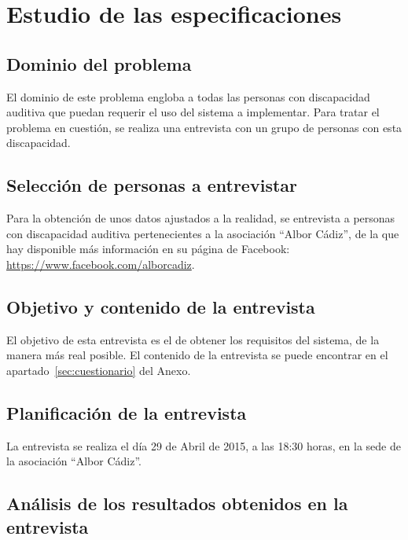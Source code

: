 \section{Estudio de las especificaciones}
    \subsection{Dominio del problema}

    El dominio de este problema engloba a todas las personas con discapacidad auditiva que puedan requerir el uso del sistema a implementar. Para tratar el problema en cuestión, se realiza una entrevista con un grupo de personas con esta discapacidad.

    \subsection{Selección de personas a entrevistar}

    Para la obtención de unos datos ajustados a la realidad, se entrevista a personas con discapacidad auditiva pertenecientes a la asociación ``Albor Cádiz'', de la que hay disponible más información en su página de Facebook: \url{https://www.facebook.com/alborcadiz}.

    \subsection{Objetivo y contenido de la entrevista}

    El objetivo de esta entrevista es el de obtener los requisitos del sistema, de la manera más real posible. El contenido de la entrevista se puede encontrar en el apartado~\ref{sec:cuestionario} del Anexo.

    \subsection{Planificación de la entrevista}

    La entrevista se realiza el día 29 de Abril de 2015, a las 18:30 horas, en la sede de la asociación ``Albor Cádiz''.

    \subsection{Análisis de los resultados obtenidos en la entrevista}

